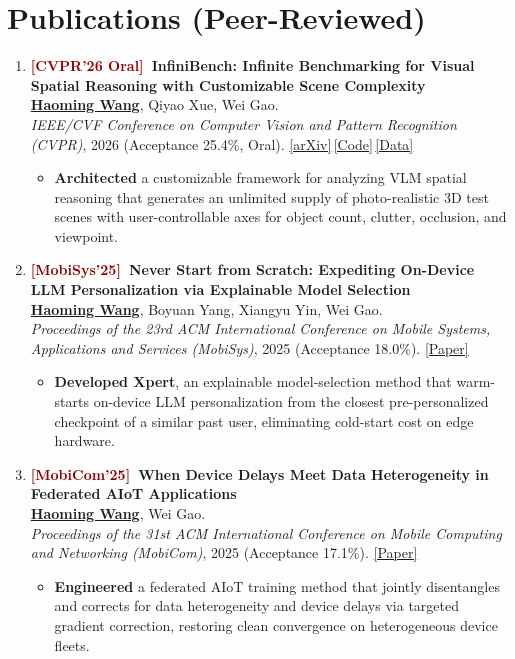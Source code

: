 \documentclass[11pt, letterpaper]{article}
\newenvironment{publist}{
  \begin{enumerate}[leftmargin=1.7em, itemsep=4pt, parsep=0pt, topsep=2pt, label=\arabic*.]
}{
  \end{enumerate}
}
\newcommand{\impactbullet}[1]{%
  \par\vspace{1pt}%
  \begin{itemize}[leftmargin=1.2em, topsep=0pt, itemsep=0pt, parsep=0pt, partopsep=0pt]
    \item #1
  \end{itemize}%
}
\newcommand{\me}{\underline{\textbf{Haoming Wang}}}
\begin{document}
\section{Publications (Peer-Reviewed)}

\begin{publist}
\item \textbf{\textcolor{darkred}{[CVPR'26 Oral]}\ InfiniBench: Infinite Benchmarking for Visual Spatial Reasoning with Customizable Scene Complexity}\\
\me, Qiyao Xue, Wei Gao.\\
\textit{IEEE/CVF Conference on Computer Vision and Pattern Recognition (CVPR)}, 2026 (Acceptance 25.4\%, Oral). \href{https://arxiv.org/abs/2511.18200}{[arXiv]}\,\href{https://github.com/pittisl/infinibench}{[Code]}\,\href{https://huggingface.co/datasets/Haoming645/infinibench}{[Data]}
\impactbullet{\textbf{Architected} a customizable framework for analyzing VLM spatial reasoning that generates an unlimited supply of photo-realistic 3D test scenes with user-controllable axes for object count, clutter, occlusion, and viewpoint.}

\item \textbf{\textcolor{darkred}{[MobiSys'25]}\ Never Start from Scratch: Expediting On-Device LLM Personalization via Explainable Model Selection}\\
\me, Boyuan Yang, Xiangyu Yin, Wei Gao.\\
\textit{Proceedings of the 23rd ACM International Conference on Mobile Systems, Applications and Services (MobiSys)}, 2025 (Acceptance 18.0\%). \href{https://haomingwang645.github.io/pdfs/xpert_paper.pdf}{[Paper]}
\impactbullet{\textbf{Developed Xpert}, an explainable model-selection method that warm-starts on-device LLM personalization from the closest pre-personalized checkpoint of a similar past user, eliminating cold-start cost on edge hardware.}

\item \textbf{\textcolor{darkred}{[MobiCom'25]}\ When Device Delays Meet Data Heterogeneity in Federated AIoT Applications}\\
\me, Wei Gao.\\
\textit{Proceedings of the 31st ACM International Conference on Mobile Computing and Networking (MobiCom)}, 2025 (Acceptance 17.1\%). \href{https://haomingwang645.github.io/pdfs/feddc_paper.pdf}{[Paper]}
\impactbullet{\textbf{Engineered} a federated AIoT training method that jointly disentangles and corrects for data heterogeneity and device delays via targeted gradient correction, restoring clean convergence on heterogeneous device fleets.}


\end{publist}
\end{document}
